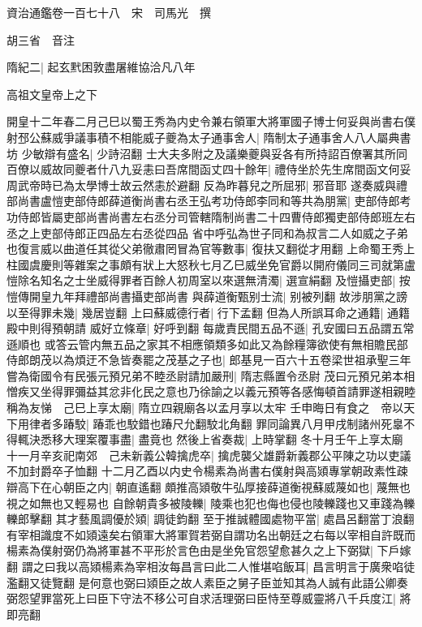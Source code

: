 資治通鑑卷一百七十八　宋　司馬光　撰

胡三省　音注

隋紀二|{
	起玄黓困敦盡屠維協洽凡八年}


高祖文皇帝上之下

開皇十二年春二月己巳以蜀王秀為内史令兼右領軍大將軍國子博士何妥與尚書右僕射邳公蘇威爭議事積不相能威子夔為太子通事舍人|{
	隋制太子通事舍人八人屬典書坊}
少敏辯有盛名|{
	少詩沼翻}
士大夫多附之及議樂夔與妥各有所持詔百僚署其所同百僚以威故同夔者什八九妥恚曰吾席間函丈四十餘年|{
	禮侍坐於先生席間函文何妥周武帝時已為太學博士故云然恚於避翻}
反為昨暮兒之所屈邪|{
	邪音耶}
遂奏威與禮部尚書盧愷吏部侍郎薛道衡尚書右丞王弘考功侍郎李同和等共為朋黨|{
	吏部侍郎考功侍郎皆屬吏部尚書尚書左右丞分司管轄隋制尚書二十四曹侍郎獨吏部侍郎班左右丞之上吏部侍郎正四品左右丞從四品}
省中呼弘為世子同和為叔言二人如威之子弟也復言威以曲道任其從父弟徹肅罔冒為官等數事|{
	復扶又翻從才用翻}
上命蜀王秀上柱國虞慶則等雜案之事頗有狀上大怒秋七月乙巳威坐免官爵以開府儀同三司就第盧愷除名知名之士坐威得罪者百餘人初周室以來選無清濁|{
	選宣絹翻}
及愷攝吏部|{
	按愷傳開皇九年拜禮部尚書攝吏部尚書}
與薛道衡甄别士流|{
	别被列翻}
故涉朋黨之謗以至得罪未幾|{
	幾居豈翻}
上曰蘇威德行者|{
	行下孟翻}
但為人所誤耳命之通籍|{
	通籍殿中則得預朝請}
威好立條章|{
	好呼到翻}
每歲責民間五品不遜|{
	孔安國曰五品謂五常遜順也}
或答云管内無五品之家其不相應領類多如此又為餘糧簿欲使有無相贍民部侍郎朗茂以為煩迂不急皆奏罷之茂基之子也|{
	郎基見一百六十五卷梁世祖承聖三年}
嘗為衛國令有民張元預兄弟不睦丞尉請加嚴刑|{
	隋志縣置令丞尉}
茂曰元預兄弟本相憎疾又坐得罪彌益其忿非化民之意也乃徐諭之以義元預等各感悔頓首請罪遂相親睦稱為友悌　己巳上享太廟|{
	隋立四親廟各以孟月享以太牢}
壬申晦日有食之　帝以天下用律者多踳駮|{
	踳乖也駮錯也踳尺允翻駮北角翻}
罪同論異八月甲戌制諸州死辠不得輒決悉移大理案覆事盡|{
	盡竟也}
然後上省奏裁|{
	上時掌翻}
冬十月壬午上享太廟　十一月辛亥祀南郊　己未新義公韓擒虎卒|{
	擒虎襲父雄爵新義郡公平陳之功以吏議不加封爵卒子恤翻}
十二月乙酉以内史令楊素為尚書右僕射與高熲專掌朝政素性疎辯高下在心朝臣之内|{
	朝直遙翻}
頗推高熲敬牛弘厚接薛道衡視蘇威蔑如也|{
	蔑無也視之如無也又輕易也}
自餘朝貴多被陵轢|{
	陵乘也犯也侮也侵也陵轢踐也又車踐為轢轢郎擊翻}
其才藝風調優於熲|{
	調徒鈞翻}
至于推誠體國處物平當|{
	處昌呂翻當丁浪翻}
有宰相識度不如熲遠矣右領軍大將軍賀若弼自謂功名出朝廷之右每以宰相自許既而楊素為僕射弼仍為將軍甚不平形於言色由是坐免官怨望愈甚久之上下弼獄|{
	下戶嫁翻}
謂之曰我以高熲楊素為宰相汝每昌言曰此二人惟堪啗飯耳|{
	昌言明言于廣衆啗徒濫翻又徒覽翻}
是何意也弼曰熲臣之故人素臣之舅子臣並知其為人誠有此語公卿奏弼怨望罪當死上曰臣下守法不移公可自求活理弼曰臣恃至尊威靈將八千兵度江|{
	將即亮翻}
